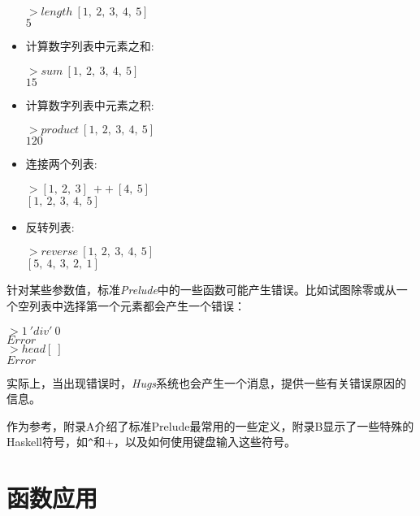 \begin{itemize}
\noindent\hspace*{1cm} $> length~[1,~2,~3,~4,~5]$\\
\hspace*{1cm} $5$

\item 计算数字列表中元素之和:

\noindent\hspace*{1cm} $> sum~[1,~2,~3,~4,~5]$\\
\hspace*{1cm} $15$

\item 计算数字列表中元素之积:

\noindent\hspace*{1cm} $> product~[1,~2,~3,~4,~5]$\\
\hspace*{1cm} $120$

\item 连接两个列表:

\noindent\hspace*{1cm} $> [1,~2,~3]~++~[4,~5]$\\
\hspace*{1cm} $[1,~2,~3,~4,~5]$

\item 反转列表:

\noindent\hspace*{1cm} $> reverse~[1,~2,~3,~4,~5]$\\
\hspace*{1cm} $[5,~4,~3,~2,~1]$

\end{itemize}

针对某些参数值，标准\textit{Prelude}中的一些函数可能产生错误。比如试图除零或从一个空列表中选择第一个元素都会产生一个错误：

\noindent\hspace*{1cm} $> 1~'div'~0$\\
\hspace*{1cm} $Error$\\
\hspace*{1cm} $> head [~]$\\
\hspace*{1cm} $Error$

实际上，当出现错误时，\textit{Hugs}系统也会产生一个消息，提供一些有关错误原因的信息。

作为参考，附录A介绍了标准Prelude最常用的一些定义，附录B显示了一些特殊的Haskell符号，如\verb|^|和$+$，以及如何使用键盘输入这些符号。

\section{函数应用}


